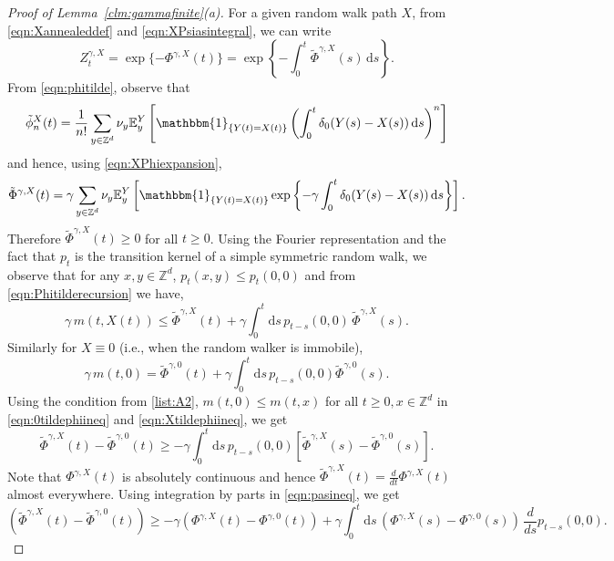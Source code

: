 \documentclass{article}[12pt]
\theoremstyle{definition}
\newcommand{\Z}{\mathbb{Z}}
\newcommand{\E}{\mathbb{E}}
\newcommand{\1}{\mathbbm{1}}
\newcommand{\dd }{\mathrm{d} }
\begin{document}
\begin{proof}[Proof of Lemma~\ref{clm:gammafinite}(a)]
For a given random walk path $X$, from \eqref{eqn:Xannealeddef} and \eqref{eqn:XPsiasintegral}, we can write 
$$Z^{\gamma, X}_t = \exp\{-\Phi^{\gamma,X}(t)\} =  \exp\left\{-\int_{0}^t \tilde{\Phi}^{\gamma,X}(s)\, \dd s\right\}.$$
From \eqref{eqn:phitilde}, observe that
{$$\tilde{\phi}^{X}_n(t) = \frac{1}{n!}\sum_{y\in \Z^d}\nu_y \E^Y_y\left[ \1_{\{Y(t)=X(t)\}}\left(\int_0^t \delta_0(Y(s)-X(s))\, \dd s\right)^n\right]$$}
and hence, using \eqref{eqn:XPhiexpansion},
$$ \tilde{\Phi}^{\gamma,X}(t) = \gamma \sum_{y\in \Z^d}\nu_y \E^Y_y\left[\1_{\{Y(t)=X(t)\}} \exp\left\{-\gamma \int_0^t \delta_0(Y(s)-X(s))\,\dd s\right\}\right].$$
Therefore $\tilde{\Phi}^{\gamma,X}(t) \ge 0$ for all $t\ge 0$. Using the Fourier representation and the fact that $p_t$ is the transition kernel of a simple symmetric random walk, we observe that for any $x, y\in\Z^d$, $p_{t}(x,y) \le p_t(0,0)$ and from \eqref{eqn:Phitilderecursion} we have,
\begin{equation}
    \gamma \, m(t,X(t)) \le \tilde{\Phi}^{\gamma, X}(t)+ \gamma \int_0^t\dd s \, p_{t-s}(0,0)\,\tilde{\Phi}^{\gamma, X}(s).
    \label{eqn:Xtildephiineq}
\end{equation}
Similarly for $X\equiv 0$ (i.e., when the random walker is immobile),
\begin{equation}
    \gamma \, m(t, 0) = \tilde{\Phi}^{\gamma, 0}(t)+\gamma \int_0^t \dd s\, p_{t-s}(0,0) \tilde{\Phi}^{\gamma, 0}(s).
    \label{eqn:0tildephiineq}
\end{equation}
Using the condition from \ref{list:A2}, $ m(t, 0) \le  m(t, x)$ for all $t\ge 0, x\in\Z^d$ in \eqref{eqn:0tildephiineq} and \eqref{eqn:Xtildephiineq}, we get
\begin{equation} 
\tilde{\Phi}^{\gamma, X}(t)-\tilde{\Phi}^{\gamma, 0}(t) \ge -\gamma \int_0^t \dd s\, p_{t-s}(0,0) \left[\tilde{\Phi}^{\gamma, X}(s)-\tilde{\Phi}^{\gamma, 0}(s)\right].
\label{eqn:pasineq}
\end{equation}
Note that $\Phi^{\gamma, X}(t)$ is absolutely continuous and hence $\tilde{\Phi}^{\gamma, X}(t) = \frac{d}{dt}\Phi^{\gamma, X}(t)$ almost everywhere. 
Using integration by parts in \eqref{eqn:pasineq}, we get 
\begin{equation}
    \left(\tilde{\Phi}^{\gamma, X}(t)-\tilde{\Phi}^{\gamma, 0}(t) \right)\ge  - \gamma \left({\Phi}^{\gamma, X}(t)-{\Phi}^{\gamma, 0}(t)\right) + \gamma \int_0^t \dd s\, \left({\Phi}^{\gamma, X}(s)-{\Phi}^{\gamma, 0}(s)\right) \, \frac{d }{ds}p_{t-s}(0,0).

\end{equation}
\end{proof}
\end{document}
